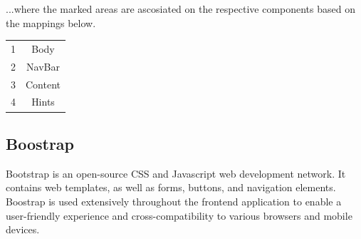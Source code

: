 			...where the marked areas are ascosiated on the respective components based on the mappings below.
			\begin{center}
				\begin{tabular}{ |c|c| } 
					\hline
					1 & Body \\
					2 & NavBar \\
					3 & Content \\
					4 & Hints \\
					\hline
				\end{tabular}
			\end{center}
		\subsection{Boostrap}
			Bootstrap is an open-source CSS and Javascript web development network. It contains web templates, as well as forms, 
			buttons, and navigation elements. Boostrap is used extensively throughout the frontend application to enable a user-friendly 
			experience and cross-compatibility to various browsers and mobile devices.
